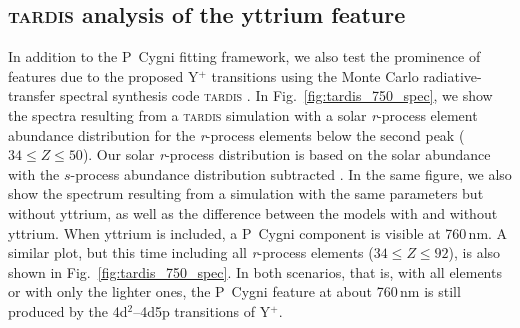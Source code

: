 \documentclass{aa}
\newcommand{\rproc}{\textit{r}-process\xspace}
\begin{document}
\subsection{\textsc{tardis} analysis of the yttrium feature}\label{sec:tardis}

In addition to the P~Cygni fitting framework, we also test the prominence of features due to the proposed Y$^+$ transitions using the Monte Carlo radiative-transfer spectral synthesis code \textsc{tardis} \citep{Kerzendorf2014}. In Fig.~\ref{fig:tardis_750_spec}, we show the spectra resulting from a \textsc{tardis} simulation with a solar \rproc element abundance distribution for the \rproc elements below the second peak ($34 \leq Z \leq 50$). Our solar \rproc distribution is based on the solar abundance \citep{Lodders2009} with the $s$-process abundance distribution subtracted \citep{Bisterzo2014}. In the same figure, we also show the spectrum resulting from a simulation with the same parameters but without yttrium, as well as the difference between the models with and without yttrium. When yttrium is included, a P~Cygni component is visible at 760\,nm. A similar plot, but this time including all \rproc elements ($34 \leq Z \leq 92$), is also shown in Fig.~\ref{fig:tardis_750_spec}. In both scenarios, that is, with all elements or with only the lighter ones, the P~Cygni feature at about 760\,nm is still produced by the 4d$^2$--4d5p transitions of Y$^+$.
\end{document}
